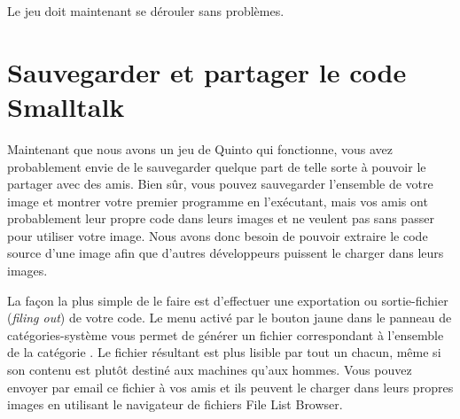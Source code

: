 \documentclass[a4paper,10pt,twoside]{book}
\begin{document}

Le jeu doit maintenant se dérouler sans problèmes.


\section{Sauvegarder et partager le code Smalltalk}
\label{sec:Monticello}

Maintenant que nous avons un jeu de Quinto qui fonctionne, vous avez
probablement envie de le sauvegarder quelque part de telle sorte à
pouvoir le partager avec des amis. Bien s\^ur, vous pouvez sauvegarder
l'ensemble de votre image \sq et montrer votre premier programme
en l'exécutant, mais vos amis ont probablement leur propre code dans
leurs images et ne veulent pas sans passer pour utiliser votre image.
Nous avons donc besoin de pouvoir extraire le code source d'une image
\sq afin que d'autres développeurs puissent le charger dans leurs images.

La façon la plus simple de le faire est d'effectuer une exportation ou
sortie-fichier (\emph{filing out}) de votre code. Le menu activé par
le bouton jaune dans le panneau de catégories-système vous permet de
générer un fichier correspondant à l'ensemble de la catégorie .
Le fichier résultant est plus lisible par tout un chacun, m\^eme si son
contenu est plut\^ot destiné aux machines qu'aux hommes.
Vous pouvez envoyer par email ce fichier à vos amis et ils peuvent le
charger dans leurs propres images \sq en utilisant le navigateur
de fichiers File List Browser.
\end{document}
